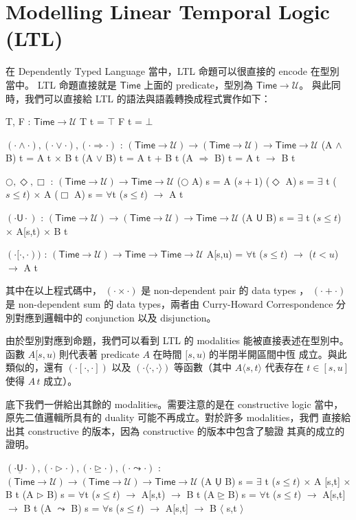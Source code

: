 \documentclass{article}
\newcommand{\Time}{\mathsf{Time}}
\newcommand{\TU}{\mathsf{U}}
\newcommand{\U}{\mathcal{U}}
\begin{document}
\section{Modelling Linear Temporal Logic (LTL)}
  在 Dependently Typed Language 當中，LTL 命題可以很直接的 encode 在型別
  當中。 LTL 命題直接就是 $\Time$ 上面的 predicate，型別為 $\Time\to\U$。
  與此同時，我們可以直接給 LTL 的語法與語義轉換成程式實作如下：

  \begin{code}
  T, F : $\Time\to\U$
  T t = $\top$
  F t = $\bot$

  $(\cdot\land\cdot), (\cdot\lor\cdot), (\cdot\Rightarrow\cdot)$ : $(\Time\to\U)\to(\Time\to\U)\to\Time\to\U$
  (A $\land$ B) t = A t $\times$ B t
  (A $\lor$ B) t = A t + B t
  (A $\Rightarrow$ B) t = A t $\to$ B t

  $\bigcirc,\Diamond,\Box$ : $(\Time\to\U)\to\Time\to\U$
  ($\bigcirc$ A) s = A ($s+1$)
  ($\Diamond$ A) s = $\exists$ {t} ($s\le t$) $\times$ A 
  ($\Box$ A) s = $\forall${t} ($s\le t$) $\to$ A t

  $(\cdot\TU\cdot)$ : $(\Time\to\U)\to(\Time\to\U)\to\Time\to\U$
  (A $\TU$ B) s = $\exists$ {t} ($s\le t$) $\times$ A[s,t) $\times$ B t

  $(\cdot[\cdot,\cdot))$ : $(\Time\to\U)\to\Time\to\Time\to\U$
  A[s,u) = $\forall${t} ($s\le t$) $\to$ ($t<u$) $\to$ A t
  \end{code}

  其中在以上程式碼中， $(\cdot\times\cdot)$ 是 non-dependent pair 的 data types
  ， $(\cdot+\cdot)$ 是 non-dependent sum 的 data types，兩者由 Curry-Howard
  Correspondence 分別對應到邏輯中的 conjunction 以及 disjunction。

  由於型別對應到命題，我們可以看到 LTL 的 modalities 能被直接表述在型別中。
  函數 $A [s,u)$ 則代表著 predicate $A$ 在時間 $[s,u)$ 的半閉半開區間中恆
  成立。與此類似的，還有 $(\cdot[\cdot,\cdot])$ 以及
  $(\cdot\langle\cdot,\cdot\rangle)$ 等函數（其中 $A\langle s,t\rangle$
  代表存在 $t\in [s,u]$ 使得 $A\,t$ 成立）。

  底下我們一併給出其餘的 modalities。需要注意的是在 constructive logic
  當中，原先二值邏輯所具有的 duality 可能不再成立。對於許多 modalities，我們
  直接給出其 constructive 的版本，因為 constructive 的版本中包含了驗證
  其真的成立的證明。

  \begin{code}
  $(\cdot\underline{\TU}\cdot),(\cdot\rhd\cdot),(\cdot\unrhd\cdot),(\cdot\leadsto\cdot)$ : $(\Time\to\U)\to(\Time\to\U)\to\Time\to\U$
  (A $\underline{\TU}$ B) s = $\exists$ {t} ($s\le t$) $\times$ A [s,t] $\times$ B t
  (A $\rhd$ B) s = $\forall${t} ($s\le t$) $\to$ A[s,t) $\to$ B t
  (A $\unrhd$ B) s = $\forall${t} ($s\le t$) $\to$ A[s,t] $\to$ B t
  (A $\leadsto$ B) s = $\forall${s} ($s\le t$) $\to$ A[s,t] $\to$ B $\langle$ s,t $\rangle$
  \end{code}
\end{document}
